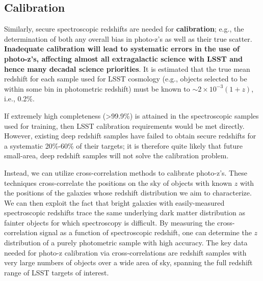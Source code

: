 \subsection{Calibration}

Similarly, secure spectroscopic redshifts are needed for {\bf calibration}; e.g., the determination of both any overall bias in photo-z's  as well as their true scatter.  {\bf Inadequate calibration will lead to systematic errors in the use of photo-z's, affecting almost all extragalactic science with LSST and hence many decadal science priorities}.  It is estimated that the true mean redshift for each sample used for LSST cosmology (e.g., objects selected to be within some bin in photometric redshift) must be known to $\sim 2\times10^{-3}(1+z)$, i.e., 0.2\%.

If extremely high completeness (>99.9\%) is attained in the spectroscopic samples used for training, then LSST calibration requirements would be met directly. However, existing deep redshift samples have failed to obtain secure redshifts for a systematic 20\%-60\% of their targets; it is therefore quite likely that future small-area, deep redshift samples will not solve the calibration problem. 

Instead, we can utilize cross-correlation methods to calibrate photo-z's.  These techniques cross-correlate the positions on the sky of objects with known $z$ with the positions of the galaxies whose redshift distribution we aim to characterize.  We can then exploit the fact that bright galaxies with easily-measured spectroscopic redshifts trace the same underlying dark matter distribution as fainter objects for which spectroscopy is difficult.    By measuring the cross-correlation signal as a function of spectroscopic redshift, one can determine the $z$ distribution of a purely photometric sample with high accuracy.  The key data needed for photo-z calibration via cross-correlations are redshift samples with very large numbers of objects over a wide area of sky, spanning the full redshift range of LSST targets of interest.

